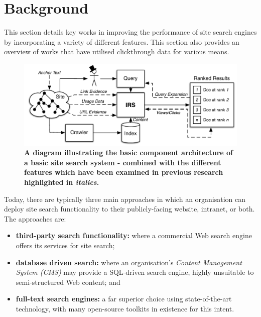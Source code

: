 \section{Background}\label{sec_background}
This section details key works in improving the performance of site search engines by incorporating a variety of different features. This section also provides an overview of works that have utilised clickthrough data for various means.

\begin{figure}
	\begin{center}
	\includegraphics[scale=1.0]{pics/ir_system_new.pdf}
	\end{center}
	\caption{\label{fig:background_architecture}\textbf{A diagram illustrating the basic component architecture of a basic site search system - combined with the different features which have been examined in previous research highlighted in \emph{italics}.\vspace{-0.1cm}}}
\end{figure}

Today, there are typically three main approaches in which an organisation can deploy site search functionality to their publicly-facing website, intranet, or both. The approaches are:

\begin{itemize}
	
	\item{\textbf{third-party search functionality:} where a commercial Web search engine offers its services for site search;}
	
	\item{\textbf{database driven search:} where an organisation's \emph{Content Management System (CMS)} may provide a SQL-driven search engine, highly unsuitable to semi-structured Web content; and}
	
	\item{\textbf{full-text search engines: } a far superior choice using state-of-the-art technology, with many open-source toolkits in existence for this intent.}
	
\end{itemize}

